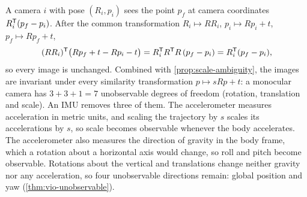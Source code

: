 \begin{solutions}
  \item A camera $i$ with pose $(R_i, p_i)$ sees the point $p_f$ at camera coordinates $R_i^{\mathsf{T}}(p_f - p_i)$. After the common
        transformation $R_i \mapsto RR_i$, $p_i \mapsto Rp_i + t$, $p_f \mapsto Rp_f + t$,
        \[
          (RR_i)^{\mathsf{T}}\big(Rp_f + t - Rp_i - t\big) = R_i^{\mathsf{T}} R^{\mathsf{T}} R\,(p_f - p_i) = R_i^{\mathsf{T}}(p_f - p_i),
        \]
        so every image is unchanged. Combined with \cref{prop:scale-ambiguity}, the images are invariant under every similarity
        transformation $p \mapsto sRp + t$: a monocular camera has $3 + 3 + 1 = 7$ unobservable degrees of freedom (rotation,
        translation and scale). An IMU removes three of them. The accelerometer measures acceleration in metric units, and
        scaling the trajectory by $s$ scales its accelerations by $s$, so scale becomes observable whenever the body
        accelerates. The accelerometer also measures the direction of gravity in the body frame, which a rotation about a
        horizontal axis would change, so roll and pitch become observable. Rotations about the vertical and translations
        change neither gravity nor any acceleration, so four unobservable directions remain: global position and yaw
        (\cref{thm:vio-unobservable}).


\end{solutions}
